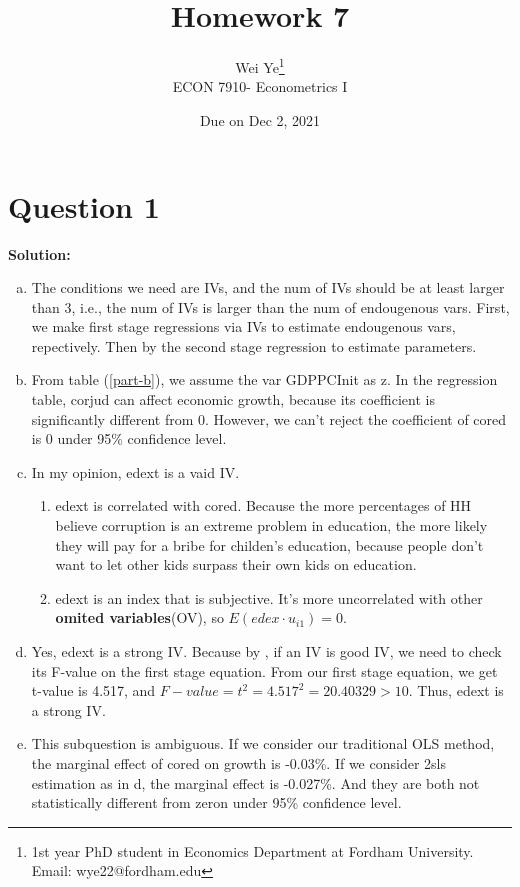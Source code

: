 \documentclass[11pt]{article} %
\title{Homework 7}
\author{Wei Ye\footnote{ 1st year PhD student in Economics Department at Fordham University. Email: wye22@fordham.edu}
    \\ ECON 7910- Econometrics I}
\date{Due on Dec 2, 2021}
\begin{document}
\maketitle

\section{Question 1}
\textbf{Solution:}
\begin{enumerate}[a. ]
    \item The conditions we need are IVs, and the num of IVs should be at least larger than 3, i.e., the num of IVs is larger than the num of endougenous vars. 
          First, we make first stage regressions via IVs to estimate endougenous vars, repectively. Then by the second stage regression to estimate parameters. 
    \item From table (\ref{part-b}), we assume the var GDPPCInit as z. In the regression table, corjud can affect economic growth, because its coefficient is significantly different from 0. 
        However, we can't reject the coefficient of cored is 0 under 95\% confidence level.
    \item In my opinion, edext is a vaid IV.
            \begin{enumerate}
                \item edext is correlated with cored. Because the more percentages of HH believe corruption is an extreme problem in education, the more likely they will pay for a bribe for childen's education, 
                        because people don't want to let other kids surpass their own kids on education.
                \item edext is an index that is subjective. It's more uncorrelated with other \textbf{omited variables}(OV), so $E(edex\cdot u_{i1})=0$.
            \end{enumerate}
    \item Yes, edext is a strong IV. Because by \citet{staiger1994instrumental}, if an IV is good IV, we need to check its F-value on the first stage equation. From our first stage equation, we get t-value is 4.517, and $F-value = t^2=4.517^2=20.40329>10$.
            Thus, edext is a strong IV. 
    \item This subquestion is ambiguous. If we consider our traditional OLS method, the marginal effect of cored on growth is -0.03\%. If we consider 2sls estimation as in d, the marginal effect is -0.027\%. And they are both not statistically different from zeron under 95\% confidence level.

\end{enumerate}
\end{document}

